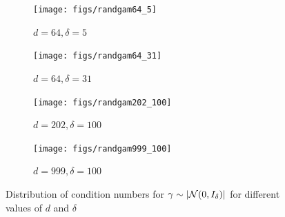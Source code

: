 \begin{figure}
  \centering
  \begin{subfigure}{.49\textwidth}
    \centering
    \texttt{[image: figs/randgam64\_5]}
    \caption{$d = 64, \delta = 5$}
    \label{fig:randgam64_5}
  \end{subfigure}
  \begin{subfigure}{.49\textwidth}
    \centering
    \texttt{[image: figs/randgam64\_31]}
    \caption{$d = 64, \delta = 31$}
    \label{fig:randgam64_31}
  \end{subfigure}
  \begin{subfigure}[b]{.49\textwidth}
    \centering
    \texttt{[image: figs/randgam202\_100]}
    \caption{$d = 202, \delta = 100$}
    \label{fig:randgam202_100}
  \end{subfigure}
  \begin{subfigure}[b]{.49\textwidth}
    \centering
    \texttt{[image: figs/randgam999\_100]}
    \caption{$d = 999, \delta = 100$}
    \label{fig:randgam999_100}
  \end{subfigure}

  \caption{Distribution of condition numbers for $\gamma \sim \lvert\mathcal{N}(0, I_{\delta})\rvert$ for different values of $d$ and $\delta$}
  \label{fig:randgam}
\end{figure}

